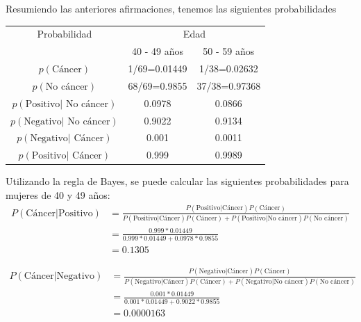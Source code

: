 \begin{Eje}
Resumiendo las anteriores afirmaciones, tenemos las siguientes probabilidades
\begin{table}[!h]
\centering
  \begin{tabular}{|c|c|c|}\hline
  Probabilidad&\multicolumn{2}{|c|}{Edad}\\\cline{2-3}
  &40 - 49 años&50 - 59 años\\\hline
  $p(\text{Cáncer})$&1/69=0.01449&1/38=0.02632\\
  $p(\text{No cáncer})$&68/69=0.9855&37/38=0.97368\\
  $p(\text{Positivo}|\text{ No cáncer})$&0.0978&0.0866\\
  $p(\text{Negativo}|\text{ No cáncer})$&0.9022&0.9134\\
  $p(\text{Negativo}|\text{ Cáncer})$&0.001&0.0011\\
  $p(\text{Positivo}|\text{ Cáncer})$&0.999&0.9989\\\hline
  \end{tabular}
\end{table}

Utilizando la regla de Bayes, se puede calcular las siguientes probabilidades para mujeres de 40 y 49 años: 
\begin{align*}
P(\text{Cáncer}|\text{Positivo})&=\frac{P(\text{Positivo}|\text{Cáncer})P(\text{Cáncer})}{P(\text{Positivo}|\text{Cáncer})P(\text{Cáncer})+P(\text{Positivo}|\text{No cáncer})P(\text{No cáncer})}\\
&=\frac{0.999*0.01449}{0.999*0.01449+0.0978*0.9855}\\
&=0.1305
\end{align*}

\begin{align*}
P(\text{Cáncer}|\text{Negativo})&=\frac{P(\text{Negativo}|\text{Cáncer})P(\text{Cáncer})}{P(\text{Negativo}|\text{Cáncer})P(\text{Cáncer})+P(\text{Negativo}|\text{No cáncer})P(\text{No cáncer})}\\
&=\frac{0.001*0.01449}{0.001*0.01449+0.9022*0.9855}\\
&=0.0000163
\end{align*}


\end{Eje}
